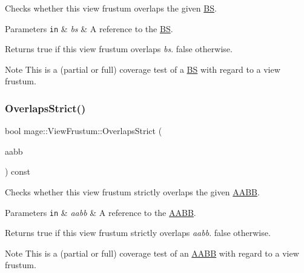 Checks whether this view frustum overlaps the given \hyperlink{structmage_1_1_b_s}{BS}.


\begin{DoxyParams}[1]{Parameters}
\mbox{\tt in}  & {\em bs} & A reference to the \hyperlink{structmage_1_1_b_s}{BS}. \\
\hline
\end{DoxyParams}
\begin{DoxyReturn}{Returns}
{\ttfamily true} if this view frustum overlaps {\itshape bs}. {\ttfamily false} otherwise. 
\end{DoxyReturn}
\begin{DoxyNote}{Note}
This is a (partial or full) coverage test of a \hyperlink{structmage_1_1_b_s}{BS} with regard to a view frustum. 
\end{DoxyNote}
\hypertarget{structmage_1_1_view_frustum_a2eef224e458509eada25ec91a53753c6}{}\label{structmage_1_1_view_frustum_a2eef224e458509eada25ec91a53753c6} 
\subsubsection{\texorpdfstring{Overlaps\+Strict()}{OverlapsStrict()}\hspace{0.1cm}{\footnotesize\ttfamily [1/2]}}
{\footnotesize\ttfamily bool mage\+::\+View\+Frustum\+::\+Overlaps\+Strict (\begin{DoxyParamCaption}\item[{const \hyperlink{structmage_1_1_a_a_b_b}{A\+A\+BB} \&}]{aabb }\end{DoxyParamCaption}) const\hspace{0.3cm}{\ttfamily [noexcept]}}

Checks whether this view frustum strictly overlaps the given \hyperlink{structmage_1_1_a_a_b_b}{A\+A\+BB}.


\begin{DoxyParams}[1]{Parameters}
\mbox{\tt in}  & {\em aabb} & A reference to the \hyperlink{structmage_1_1_a_a_b_b}{A\+A\+BB}. \\
\hline
\end{DoxyParams}
\begin{DoxyReturn}{Returns}
{\ttfamily true} if this view frustum strictly overlaps {\itshape aabb}. {\ttfamily false} otherwise. 
\end{DoxyReturn}
\begin{DoxyNote}{Note}
This is a (partial or full) coverage test of an \hyperlink{structmage_1_1_a_a_b_b}{A\+A\+BB} with regard to a view frustum. 
\end{DoxyNote}
\hypertarget{structmage_1_1_view_frustum_a05963d6685c8cafc22be50c8e9b405df}{}\label{structmage_1_1_view_frustum_a05963d6685c8cafc22be50c8e9b405df} 
